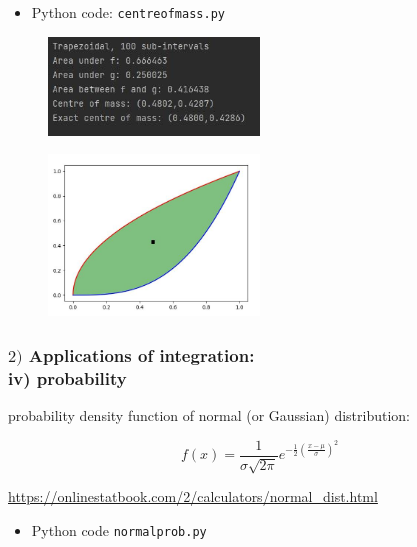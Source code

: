 \documentclass[english,14pt]{beamer}
\begin{document}

\begin{frame}[fragile]

\frametitle{}

\begin{itemize}
	\item Python code: \texttt{centreofmass.py}
\end{itemize}

\begin{figure}[ht]
	\centering
	\includegraphics[width=0.5\textwidth]{figures/centreofmassoutput}
\end{figure}
\begin{figure}[ht]
	\centering
	\includegraphics[width=0.5\textwidth]{figures/centreofmassgraph}
\end{figure}

\end{frame}


\begin{frame}[fragile]

\frametitle{$2)$ Applications of integration: \\ \qquad iv) probability}

probability density function of normal (or Gaussian) distribution:

\[
f(x) = \frac{1}{\sigma\sqrt{2\pi}} e^{-\frac{1}{2}\left(\frac{x-\mu}{\sigma}\right)^2}
\]

\href{https://onlinestatbook.com/2/calculators/normal_dist.html}{https://onlinestatbook.com/2/calculators/normal\_dist.html}

\begin{itemize}
	\item Python code \texttt{normalprob.py}
\end{itemize}

\end{frame}
\end{document}
